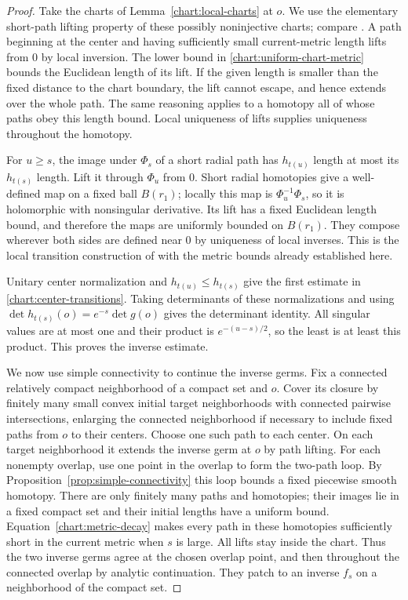 \begin{proof}
Take the charts of Lemma~\ref{chart:local-charts} at $o$.
We use the elementary short-path lifting property of these
possibly noninjective charts; compare
\cite[Lemmas~2.2--2.3 and Corollary~2.2]{ChauTamStein}.
A path beginning at the center and having sufficiently small
current-metric length lifts from $0$ by local inversion.
The lower bound in \eqref{chart:uniform-chart-metric} bounds
the Euclidean length of its lift.  If the given length is
smaller than the fixed distance to the chart boundary, the
lift cannot escape, and hence extends over the whole path.
The same reasoning applies to a homotopy all of whose paths
obey this length bound.  Local uniqueness of lifts supplies
uniqueness throughout the homotopy.

For $u\ge s$, the image under $\Phi_s$ of a short radial path
has $h_{t(u)}$ length at most its $h_{t(s)}$ length.  Lift it
through $\Phi_u$ from $0$.  Short radial homotopies give a
well-defined map on a fixed ball $B(r_1)$; locally this map
is $\Phi_u^{-1}\Phi_s$, so it is holomorphic with nonsingular
derivative.  Its lift has a fixed Euclidean length bound, and
therefore the maps are uniformly bounded on $B(r_1)$.
They compose wherever both sides are defined near $0$ by
uniqueness of local inverses.  This is the local transition
construction of \cite[Lemmas~3.1--3.2]{ChauTamStein} with the
metric bounds already established here.

Unitary center normalization and $h_{t(u)}\le h_{t(s)}$
give the first estimate in \eqref{chart:center-transitions}.
Taking determinants of these normalizations and using
$\det h_{t(s)}(o)=e^{-s}\det g(o)$ gives the determinant
identity.  All singular values are at most one and their
product is $e^{-(u-s)/2}$, so the least is at least this
product.  This proves the inverse estimate.

We now use simple connectivity to continue the inverse germs.
Fix a connected relatively compact neighborhood of a compact
set and $o$.  Cover its closure by finitely many small convex
initial target neighborhoods with connected pairwise
intersections, enlarging the connected neighborhood if
necessary to include fixed paths from $o$ to their centers.
Choose one such path to each center.  On each target
neighborhood it extends the inverse germ at $o$ by path
lifting.  For each nonempty overlap, use one point in the
overlap to form the two-path loop.  By
Proposition~\ref{prop:simple-connectivity} this loop bounds
a fixed piecewise smooth homotopy.  There are only finitely
many paths and homotopies; their images lie in a fixed
compact set and their initial lengths have a uniform bound.
Equation~\eqref{chart:metric-decay} makes every path in these
homotopies sufficiently short in the current metric when
$s$ is large.  All lifts stay inside the chart.  Thus the
two inverse germs agree at the chosen overlap point, and
then throughout the connected overlap by analytic
continuation.  They patch to an inverse $f_s$ on a
neighborhood of the compact set.


\end{proof}
